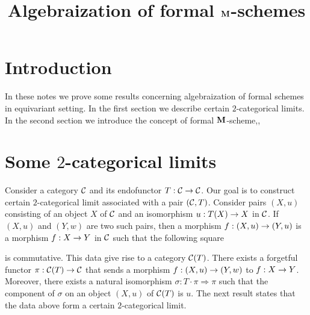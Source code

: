 

\usepackage{todonotes}
\newcommand{\lstodo}[1]{\todo[color=green!40,bordercolor=green,size=\footnotesize]{\textbf{LS TODO: }#1}}



\title{Algebraization of formal $\mathbf{M}$-schemes}
\date{}
\maketitle

\section{Introduction}
\noindent
In these notes we prove some results concerning algebraization of formal schemes in equivariant setting. In the first section we describe certain $2$-categorical limits. In the second section we introduce the concept of formal $\mathbf{M}$-scheme,,

\section{Some $2$-categorical limits}
\noindent
Consider a category ${\mathcal C}$ and its endofunctor $T:{\mathcal C}\rightarrow {\mathcal C}$. Our goal is to construct certain $2$-categorical limit associated with a pair $({\mathcal C},T)$. Consider pairs $\left(X,u\right)$ consisting of an object $X$ of ${\mathcal C}$ and an isomorphism $u:T(X)\rightarrow X$ in ${\mathcal C}$. If $\left(X,u\right)$ and $\left(Y,w\right)$ are two such pairs, then a morphism $f:(X,u) \rightarrow (Y,u)$ is a morphism $f:X\rightarrow Y$ in ${\mathcal C}$ such that the following square
\begin{center}
\end{center}
is commutative. This data give rise to a category ${\mathcal C}(T)$. There exists a forgetful functor $\pi:{\mathcal C}(T)\rightarrow {\mathcal C}$ that sends a morphism $f:(X,u)\rightarrow (Y,w)$ to $f:X\rightarrow Y$. Moreover, there exists a natural isomorphism $\sigma:T\cdot \pi \Rightarrow \pi$ such that the component of $\sigma$ on an object $(X,u)$ of ${\mathcal C}(T)$ is $u$. The next result states that the data above form a certain $2$-categorical limit.

